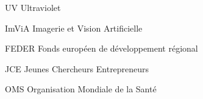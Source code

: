             {UV}
            {Ultraviolet}

            {ImViA}
            {Imagerie et Vision Artificielle}
            
            {FEDER}
            {Fonds européen de développement régional}

            {JCE}
            {Jeunes Chercheurs Entrepreneurs}
  
            {OMS}
            {Organisation Mondiale de la Santé}          
            